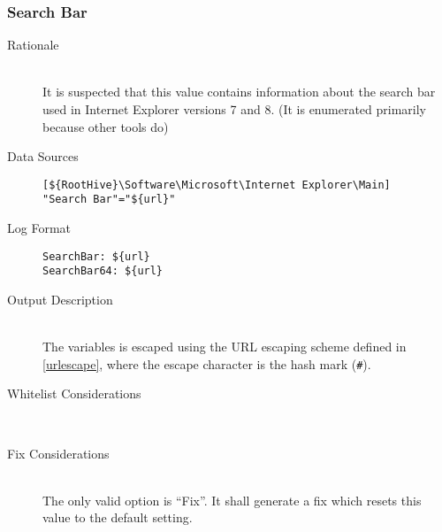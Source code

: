 \subsubsection{Search Bar}
\begin{description}
\item[Rationale]  \hfill \\ It is suspected that this value contains information
about the search bar used in Internet Explorer versions 7 and 8. (It is
enumerated primarily because other tools do)

\item[Data Sources] \hfill
\vspace{-\baselineskip}
\begin{verbatim}
[${RootHive}\Software\Microsoft\Internet Explorer\Main]
"Search Bar"="${url}"
\end{verbatim}
\item[Log Format] \hfill
\vspace{-\baselineskip}
\begin{verbatim} 
SearchBar: ${url}
SearchBar64: ${url}
\end{verbatim}
\item[Output Description] \hfill \\
The variables  is escaped using the URL escaping
scheme defined in \ref{urlescape}, where the escape character is the hash mark
(\verb|#|).
\item[Whitelist Considerations] \hfill \\

\item[Fix Considerations] \hfill \\
The only valid option is ``Fix''. It shall generate a fix which resets this
value to the default setting.
\end{description}

